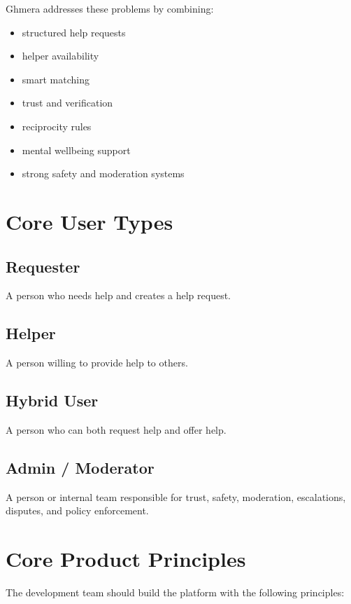 \documentclass[11pt]{article}
\begin{document}
Ghmera addresses these problems by combining:
\begin{itemize}[leftmargin=1.5em]
    \item structured help requests
    \item helper availability
    \item smart matching
    \item trust and verification
    \item reciprocity rules
    \item mental wellbeing support
    \item strong safety and moderation systems
\end{itemize}

\section{Core User Types}

\subsection{Requester}
A person who needs help and creates a help request.

\subsection{Helper}
A person willing to provide help to others.

\subsection{Hybrid User}
A person who can both request help and offer help.

\subsection{Admin / Moderator}
A person or internal team responsible for trust, safety, moderation, escalations, disputes, and policy enforcement.

\section{Core Product Principles}

The development team should build the platform with the following principles:
\end{document}
